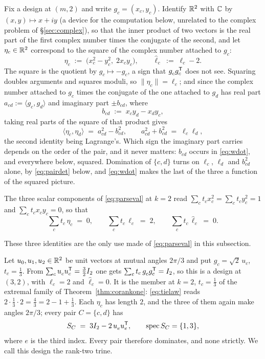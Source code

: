 Fix a design at $(m,2)$ and write $g_c=(x_c,y_c)$.  Identify $\mathbb{R}^2$ with
$\mathbb{C}$ by $(x,y)\mapsto x+iy$ (a device for the computation below,
unrelated to the complex problem of \S\ref{sec:complex}), so that the
inner product of two vectors is the real part of the first complex number
times the conjugate of the second, and let $\eta_c\in\mathbb{R}^2$ correspond to
the square of the complex number attached to $g_c$:
\begin{equation}\label{eq:doubleangle}
  \eta_c\;:=\;\bigl(x_c^2-y_c^2,\;2x_cy_c\bigr),
  \qquad
  \hat\ell_c\;:=\;\ell_c-2 .
\end{equation}
The square is the quotient by $g_c\mapsto-g_c$, a sign that
$g_c^{\vphantom{\mathsf{T}}}g_c\tp$ does not see.  Squaring doubles
arguments and squares moduli, so $\lVert
\eta_c\rVert=\ell_c$; and since the complex number attached to $g_c$ times
the conjugate of the one attached to $g_d$ has real part
$a_{cd}:=\langle g_c,g_d\rangle$ and imaginary part $\pm b_{cd}$, where
\[
  b_{cd}\;:=\;x_cy_d-x_dy_c ,
\]
taking real parts of the square of that product gives
\begin{equation}\label{eq:wdot}
  \langle \eta_c,\eta_d\rangle\;=\;a_{cd}^2-b_{cd}^2 ,
  \qquad
  a_{cd}^2+b_{cd}^2\;=\;\ell_c\ell_d ,
\end{equation}
the second identity being Lagrange's.  Which sign the imaginary part
carries depends on the order of the pair, and it never matters: $b_{cd}$
occurs in \eqref{eq:wdot}, and everywhere below, squared.  Domination of
$\{c,d\}$ turns on $\ell_c$, $\ell_d$ and $b_{cd}^2$ alone, by
\eqref{eq:pairdet} below, and \eqref{eq:wdot} makes the last of the three
a function of the squared picture.

The three scalar components of
\eqref{eq:parseval} at $k=2$ read $\sum_ct_cx_c^2=\sum_ct_cy_c^2=1$ and
$\sum_ct_cx_cy_c=0$, so that
\begin{equation}\label{eq:balance2}
  \sum_c t_c\,\eta_c\;=\;0,
  \qquad
  \sum_c t_c\,\ell_c\;=\;2,
  \qquad
  \sum_c t_c\,\hat\ell_c\;=\;0 .
\end{equation}

These three identities are the only use made of \eqref{eq:parseval} in
this subsection.

\begin{example}\label{ex:trine2}
Let $u_0,u_1,u_2\in\mathbb{R}^2$ be unit vectors at mutual angles $2\pi/3$ and put
$g_c=\sqrt2\,u_c$, $t_c=\tfrac13$.  From $\sum_cu_c^{\vphantom{\mathsf{T}}}u_c\tp
=\tfrac32I_2$ one gets $\sum_ct_c\,g_c^{\vphantom{\mathsf{T}}}g_c\tp=I_2$, so this
is a design at $(3,2)$, with $\ell_c=2$ and $\hat\ell_c=0$.  It is the member at
$k=2$, $t_c=\tfrac13$ of the extremal family of
Theorem~\ref{thm:corankone}: \eqref{eq:tielaw} reads
$2\cdot\tfrac13\cdot2=\tfrac43=2-1+\tfrac13$.  Each $\eta_c$ has length $2$,
and the three of them again make angles $2\pi/3$; every pair
$C=\{c,d\}$ has
\[
  \SC\;=\;3I_2-2\,u_e^{\vphantom{\mathsf{T}}}u_e\tp,
  \qquad
  \operatorname{spec}\SC=\{1,3\},
\]
where $e$ is the third index.  Every pair therefore dominates, and none
strictly.  We call this design the rank-two trine.
\end{example}

